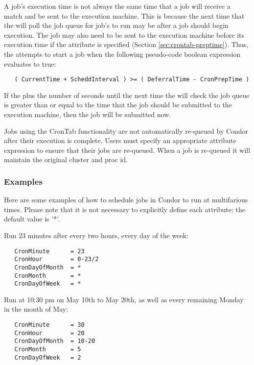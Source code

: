 A job's execution time is not always the same time that a job 
will receive a match and be sent to the execution machine. 
This is because the next time that the  
will poll the job queue for job's to run may be after 
a job should begin execution. 
The job may also need to be  sent to the execution machine before 
its execution time if the  attribute is
specified (Section \ref{sec:crontab-preptime}). 
Thus, the  attempts to start a job when the 
following pseudo-code boolean expression evaluates to true:

\begin{verbatim}
   ( CurrentTime + ScheddInterval ) >= ( DeferralTime - CronPrepTime )
\end{verbatim}

If the  plus the number of seconds 
until the next time the  will check 
the job queue is greater than or equal to the time that the job 
should be submitted to the execution machine, 
then the job will be submitted now.

Jobs using the CronTab functionality are not automatically 
re-queued by Condor after their execution is complete. 
Users must specify an appropriate  
attribute expression to ensure that their jobs are re-queued. 
When a job is re-queued it will maintain the original cluster and proc id.

\subsubsection{Examples}
\label{sec:crontab-examples}

Here are some examples of how to schedule jobs in Condor to
run at multifarious times. 
Please note that it is not necessary to 
explicitly define each attribute; the default value is '*'.

Run 23 minutes after every two hours, every day of the week:

\begin{verbatim}
   CronMinute      = 23
   CronHour        = 0-23/2
   CronDayOfMonth  = *
   CronMonth       = *
   CronDayOfWeek   = *
\end{verbatim}

Run at 10:30 pm on May 10th to May 20th, as well as every 
remaining Monday in the month of May:

\begin{verbatim}
   CronMinute      = 30
   CronHour        = 20
   CronDayOfMonth  = 10-20
   CronMonth       = 5
   CronDayOfWeek   = 2
\end{verbatim}

